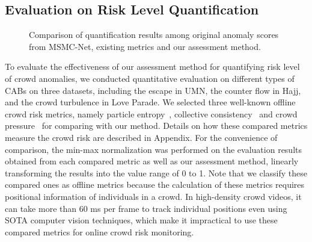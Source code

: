 \documentclass[journal]{IEEEtran}
\begin{document}
\subsection{Evaluation on Risk Level Quantification}


\begin{figure}[t]
\centering
    
    
    \caption{
		Comparison of quantification results among original anomaly scores from MSMC-Net, existing metrics and our assessment method. 
}
\label{quantify}
\end{figure}

To evaluate the effectiveness of our assessment method for quantifying risk level of crowd anomalies, we conducted quantitative evaluation on different types of CABs on three datasets, including the escape in UMN, the counter flow in Hajj, and the crowd turbulence in Love Parade. We selected three well-known offline crowd risk metrics, namely particle entropy~\cite{gu2014abnormal}, collective consistency~\cite{zhou2013measuring} and crowd pressure~\cite{johansson2008crowd} for comparing with our method. Details on how
these compared metrics measure the crowd risk are described in Appendix. For the convenience of comparison, the min-max normalization was performed on the evaluation results obtained from each compared metric as well as our assessment method, linearly transforming the results into the value range of 0 to 1. Note that we classify these compared ones as offline metrics because the calculation of these metrics requires positional information of individuals in a crowd. In high-density crowd videos, it can take more than 60 ms per frame to track individual positions even using SOTA computer vision techniques, which make it impractical to use these compared metrics for online crowd risk monitoring. 
\end{document}
